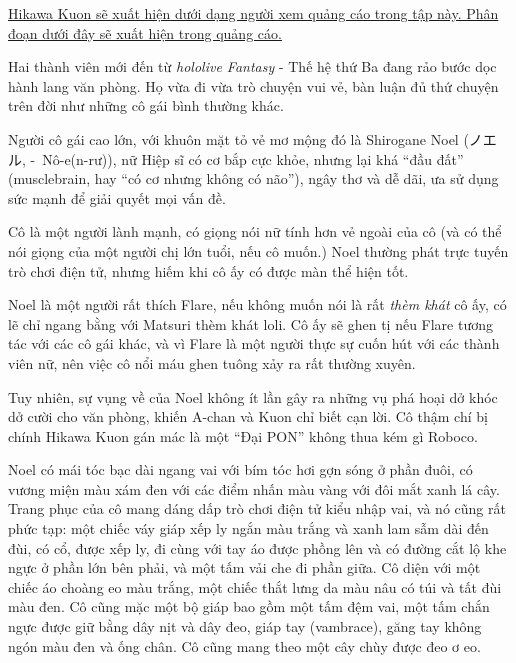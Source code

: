 \documentclass[../main.tex]{subfiles}
\begin{document}

\begin{center}
  \uline{Hikawa Kuon sẽ xuất hiện dưới dạng người xem quảng cáo trong tập này. Phân đoạn dưới đây sẽ xuất hiện trong quảng cáo.}
\end{center}

Hai thành viên mới đến từ \textit{hololive Fantasy} - Thế hệ thứ Ba đang rảo bước dọc hành lang văn phòng. Họ vừa đi vừa trò chuyện vui vẻ, bàn luận đủ thứ chuyện trên đời như những cô gái bình thường khác.

\chrint


Người cô gái cao lớn, với khuôn mặt tỏ vẻ mơ mộng đó là Shirogane Noel (ノエル, -\ Nô-e(n-rư)), nữ Hiệp sĩ có cơ bắp cực khỏe, nhưng lại khá ``đầu đất'' (musclebrain, hay ``có cơ nhưng không có não''), ngây thơ và dễ dãi, ưa sử dụng sức mạnh để giải quyết mọi vấn đề.

Cô là một người lành mạnh, có giọng nói nữ tính hơn vẻ ngoài của cô (và có thể nói giọng của một người chị lớn tuổi, nếu cô muốn.) Noel thường phát trực tuyến trò chơi điện tử, nhưng hiếm khi cô ấy có được màn thể hiện tốt.

Noel là một người rất thích Flare, nếu không muốn nói là rất \emph{thèm khát} cô ấy, có lẽ chỉ ngang bằng với Matsuri thèm khát loli. Cô ấy sẽ ghen tị nếu Flare tương tác với các cô gái khác, và vì Flare là một người thực sự cuốn hút với các thành viên nữ, nên việc cô nổi máu ghen tuông xảy ra rất thường xuyên.

Tuy nhiên, sự vụng về của Noel không ít lần gây ra những vụ phá hoại dở khóc dở cười cho văn phòng, khiến A-chan và Kuon chỉ biết cạn lời. Cô thậm chí bị chính Hikawa Kuon gán mác là một ``Đại PON'' không thua kém gì Roboco.

Noel có mái tóc bạc dài ngang vai với bím tóc hơi gợn sóng ở phần đuôi, có vương miện màu xám đen với các điểm nhấn màu vàng với đôi mắt xanh lá cây. Trang phục của cô mang dáng dấp trò chơi điện tử kiểu nhập vai, và nó cũng rất phức tạp: một chiếc váy giáp xếp ly ngắn màu trắng và xanh lam sẫm dài đến đùi, có cổ, được xếp ly, đi cùng với tay áo được phồng lên và có đường cắt lộ khe ngực ở phần lớn bên phải, và một tấm vải che đi phần giữa. Cô diện với một chiếc áo choàng eo màu trắng, một chiếc thắt lưng da màu nâu có túi và tất đùi màu đen. Cô cũng mặc một bộ giáp bao gồm một tấm đệm vai, một tấm chắn ngực được giữ bằng dây nịt và dây đeo, giáp tay (vambrace), găng tay không ngón màu đen và ống chân. Cô cũng mang theo một cây chùy được đeo ơ eo.
\end{document}
